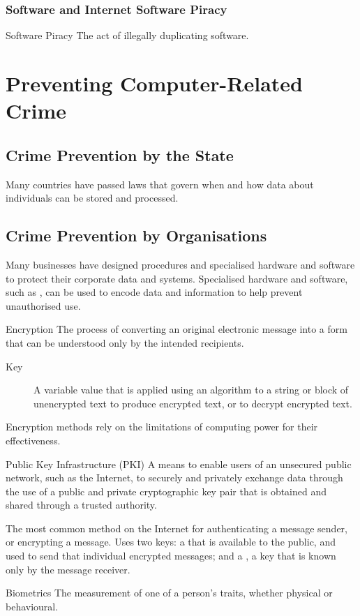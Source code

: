 \documentclass[\main/notes.tex]{subfiles}
\begin{document}
				\subsubsection{Software and Internet Software Piracy}
					\begin{definition}{Software Piracy}
						The act of illegally duplicating software.
					\end{definition}

		\section{Preventing Computer-Related Crime}
			\subsection{Crime Prevention by the State}
				Many countries have passed laws that govern when and how data about individuals can be stored and processed.
			\subsection{Crime Prevention by Organisations}
				Many businesses have designed procedures and specialised hardware and software to protect their corporate data and systems. Specialised hardware and software, such as , can be used to encode data and information to help prevent unauthorised use.
				\begin{definition}{Encryption}
					The process of converting an original electronic message into a form that can be understood only by the intended recipients.
					\begin{description}
						\item[Key] A variable value that is applied using an algorithm to a string or block of unencrypted text to produce encrypted text, or to decrypt encrypted text.
					\end{description}
					Encryption methods rely on the limitations of computing power for their effectiveness.
				\end{definition}
				\begin{definition}{Public Key Infrastructure (PKI)}
					A means to enable users of an unsecured public network, such as the Internet, to securely and privately exchange data through the use of a public and private cryptographic key pair that is obtained and shared through a trusted authority.

					The most common method on the Internet for authenticating a message sender, or encrypting a message. Uses two keys: a  that is available to the public, and used to send that individual encrypted messages; and a , a key that is known only by the message receiver.
				\end{definition}
				\begin{definition}{Biometrics}
					The measurement of one of a person's traits, whether physical or behavioural.
				\end{definition}
\end{document}
